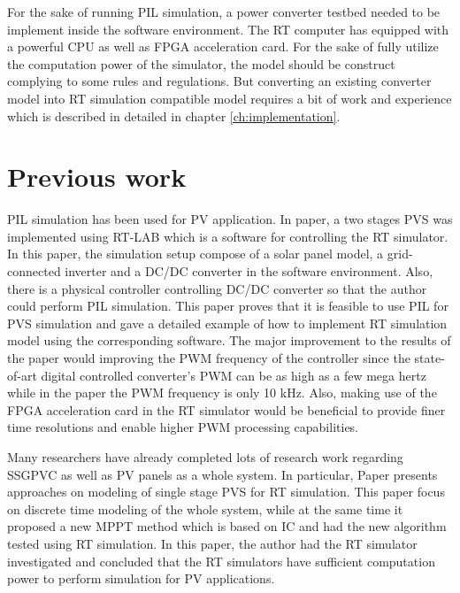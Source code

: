 For the sake of running \gls{PIL} simulation, a power converter testbed needed to be implement inside the software environment. The \gls{RT} computer has equipped with a powerful \gls{CPU} as well as \gls{FPGA} acceleration card. For the sake of fully utilize the computation power of the simulator, the model should be construct complying to some rules and regulations. But converting an existing converter model into \gls{RT} simulation compatible model requires a bit of work and experience which is described in detailed in chapter \ref{ch:implementation}.

\section{Previous work}
\gls{PIL} simulation has been used for \gls{PV} application. In paper,\cite{RN11} a two stages \gls{PVS} was implemented using RT-LAB which is a software for controlling the \gls{RT} simulator. In this paper, the simulation setup compose of a solar panel model, a grid-connected inverter and a DC/DC converter in the software environment. Also, there is a physical controller controlling DC/DC converter so that the author could perform \gls{PIL} simulation. This paper proves that it is feasible to use \gls{PIL} for \gls{PVS} simulation and gave a detailed example of how to implement \gls{RT} simulation model using the corresponding software. The major improvement to the results of the paper would improving the \gls{PWM} frequency of the controller since the state-of-art digital controlled converter's \gls{PWM} can be as high as a few mega hertz while in the paper the \gls{PWM} frequency is only 10 kHz. Also, making use of the \gls{FPGA} acceleration card in the \gls{RT} simulator would be beneficial to provide finer time resolutions and enable higher \gls{PWM} processing capabilities.

Many researchers have already completed lots of research work regarding \gls{SSGPVC} as well as PV panels as a whole system. In particular, Paper \cite{RN3} presents approaches on modeling of single stage \gls{PVS} for \gls{RT} simulation. This paper focus on discrete time modeling of the whole system, while at the same time it proposed a new MPPT method which is based on \gls{IC} and had the new algorithm tested using \gls{RT} simulation. In this paper, the author had the \gls{RT} simulator investigated and concluded that the \gls{RT} simulators have sufficient computation power to perform simulation for PV applications. 